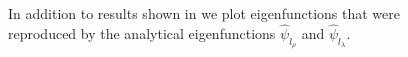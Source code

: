 \begin{figure}[H]
\begin{tabular}{cc}
\end{tabular}
\caption{In addition to results shown in  we plot eigenfunctions that were reproduced by the analytical eigenfunctions $\hat{\psi}_{l_\rho}$ and $\hat{\psi}_{l_\lambda}$. }
\label{fig:nVa_hyp_evec} 
\end{figure}


